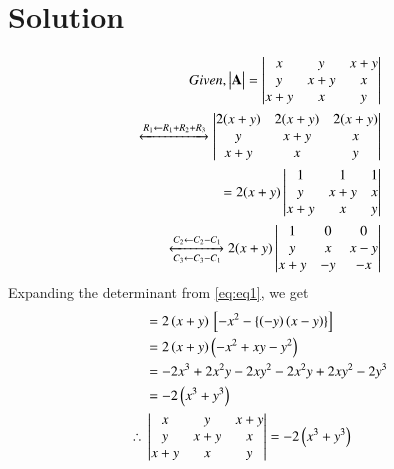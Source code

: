 \documentclass[journal,12pt,twocolumn]{IEEEtran}
\begin{document}
\section{Solution}
\begin{align}
	Given, \begin{vmatrix}\mathbf{A}\end{vmatrix} = \begin{vmatrix}x & y & x+y\\ y & x+y & x\\ x+y & x &y\end{vmatrix}\\
	\xleftrightarrow{ R_1 \leftarrow R_1 + R_2 + R_3} \begin{vmatrix}2(x + y) & 2(x + y) & 2(x + y)\\ y & x+y & x\\ x+y & x &y\end{vmatrix}\\
	= 2(x + y)\begin{vmatrix}1 & 1 & 1\\ y & x+y & x\\ x+y & x &y\end{vmatrix}\\
	\xleftrightarrow[C_3 \leftarrow C_3 - C_1]{C_2 \leftarrow C_2 - C_1}
	2(x + y) \begin{vmatrix}1 & 0 & 0\\ y & x & x-y\\ x+y & -y &-x\end{vmatrix}\label{eq:eq1}
\end{align}
Expanding the determinant from \eqref{eq:eq1}, we get
\begin{align}
     &= 2\left(x + y\right){}\left[-x^2 - \left\{\left(-y\right)\left(x-y\right)\right\}\right]\\
     &= 2\left(x + y\right) \left(-x^2 + xy - y^2\right)\\
     &= -2x^3 + 2x^2y - 2xy^2 - 2x^2y + 2xy^2 - 2y^3\\
     &= -2\left(x^3 + y^3\right)\\
     \therefore{}&\begin{vmatrix}x & y & x+y\\ y & x+y & x\\ x+y & x &y\end{vmatrix} = -2\left(x^3 + y^3\right)
\end{align}
\end{document}
